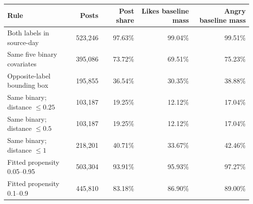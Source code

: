 \begin{tabular}{lrrrr}
\toprule
Rule & Posts & Post share & Likes baseline mass & Angry baseline mass \\
\midrule
Both labels in source-day & 523,246 & 97.63\% & 99.04\% & 99.51\% \\
Same five binary covariates & 395,086 & 73.72\% & 69.51\% & 75.23\% \\
Opposite-label bounding box & 195,855 & 36.54\% & 30.35\% & 38.88\% \\
Same binary; distance $\leq0.25$ & 103,187 & 19.25\% & 12.12\% & 17.04\% \\
Same binary; distance $\leq0.5$ & 103,187 & 19.25\% & 12.12\% & 17.04\% \\
Same binary; distance $\leq1$ & 218,201 & 40.71\% & 33.67\% & 42.46\% \\
Fitted propensity 0.05--0.95 & 503,304 & 93.91\% & 95.93\% & 97.27\% \\
Fitted propensity 0.1--0.9 & 445,810 & 83.18\% & 86.90\% & 89.00\% \\
\bottomrule
\end{tabular}

